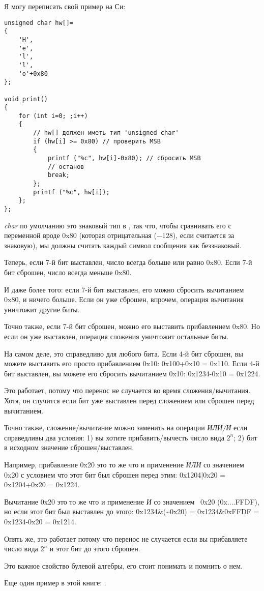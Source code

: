 Я могу переписать свой пример на Си:

\begin{lstlisting}[style=customc]
unsigned char hw[]=
{
	'H',
	'e',
	'l',
	'l',
	'o'+0x80
};

void print()
{
	for (int i=0; ;i++)
	{
		// hw[] должен иметь тип 'unsigned char'
		if (hw[i] >= 0x80) // проверить MSB
		{
			printf ("%c", hw[i]-0x80); // сбросить MSB
			// останов
			break;
		};
		printf ("%c", hw[i]);
	};
};
\end{lstlisting}

\emph{char} по умолчанию это знаковый тип в \CCpp, так что, чтобы сравнивать его с переменной вроде 0x80 (которая отрицательная
($-128$),
если считается за знаковую),
мы должны считать каждый символ сообщения как беззнаковый.

Теперь, если 7-й бит выставлен, число всегда больше или равно 0x80.
Если 7-й бит сброшен, число всегда меньше 0x80.

И даже более того: если 7-й бит выставлен, его можно сбросить вычитанием 0x80, и ничего больше.
Если он уже сброшен, впрочем, операция вычитания уничтожит другие биты.

Точно также, если 7-й бит сброшен, можно его выставить прибавлением 0x80.
Но если он уже выставлен, операция сложения уничтожит остальные биты.

На самом деле, это справедливо для любого бита.
Если 4-й бит сброшен, вы можете выставить его просто прибавлением 0x10: 0x100+0x10 = 0x110.
Если 4-й бит выставлен, вы можете его сбросить вычитанием 0x10: 0x1234-0x10 = 0x1224.

Это работает, потому что перенос не случается во время сложения/вычитания.
Хотя, он случится если бит уже выставлен перед сложением или сброшен перед вычитанием.

Точно также, сложение/вычитание можно заменить на операции \emph{ИЛИ/И} если справедливы два условия:
1) вы хотите прибавить/вычесть число вида $2^n$;
2) бит в исходном значение сброшен/выставлен.

Например, прибавление 0x20 это то же что и применение \emph{ИЛИ} со значением 0x20 с условием что этот бит был сброшен перед
этим:
0x1204|0x20 = 0x1204+0x20 = 0x1224.

Вычитание 0x20 это то же что и применение \emph{И} со значением ~0x20 (0x....FFDF), но если этот бит был выставлен до этого:
0x1234\&(\~{}0x20) = 0x1234\&0xFFDF = 0x1234-0x20 = 0x1214.

Опять же, это работает потому что перенос не случается если вы прибавляете число вида $2^n$ и этот бит до этого сброшен.

Это важное свойство булевой алгебры, его стоит понимать и помнить о нем.

Еще один пример в этой книге: .

